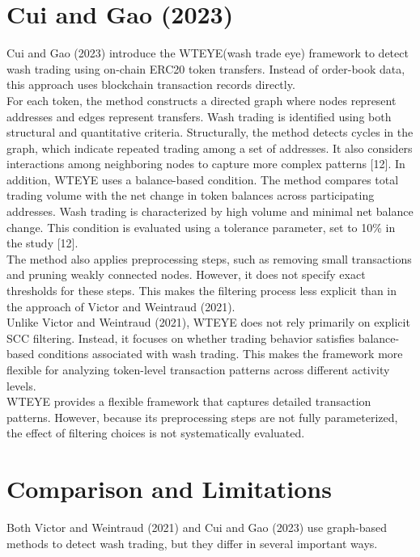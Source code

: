 \documentclass[language=english,thesis=bachelor,nosecondtitle,onesided,faculty=cb]{hsmw-thesis}
\begin{document}
	\section{Cui and Gao (2023)}
Cui and Gao (2023) introduce the WTEYE(wash trade eye) framework to detect wash trading using on-chain ERC20 token transfers. Instead of order-book data, this approach uses blockchain transaction records directly.\\
For each token, the method constructs a directed graph where nodes represent addresses and edges represent transfers. Wash trading is identified using both structural and quantitative criteria. Structurally, the method detects cycles in the graph, which indicate repeated trading among a set of addresses. It also considers interactions among neighboring nodes to capture more complex patterns [12].
In addition, WTEYE uses a balance-based condition. The method compares total trading volume with the net change in token balances across participating addresses. Wash trading is characterized by high volume and minimal net balance change. This condition is evaluated using a tolerance parameter, set to 10\% in the study [12].\\
The method also applies preprocessing steps, such as removing small transactions and pruning weakly connected nodes. However, it does not specify exact thresholds for these steps. This makes the filtering process less explicit than in the approach of Victor and Weintraud (2021).\\
Unlike Victor and Weintraud (2021), WTEYE does not rely primarily on explicit SCC filtering. Instead, it focuses on whether trading behavior satisfies balance-based conditions associated with wash trading. This makes the framework more flexible for analyzing token-level transaction patterns across different activity levels.\\
WTEYE provides a flexible framework that captures detailed transaction patterns. However, because its preprocessing steps are not fully parameterized, the effect of filtering choices is not systematically evaluated.

	\section{Comparison and Limitations}
Both Victor and Weintraud (2021) and Cui and Gao (2023) use graph-based methods to detect wash trading, but they differ in several important ways.
\end{document}
